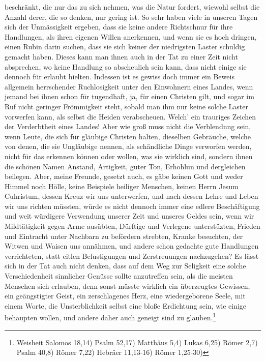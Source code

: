 beschränkt, die nur das zu sich nehmen, was die Natur fordert, wiewohl selbst
die Anzahl derer, die so denken, nur gering ist. So sehr haben viele in unseren
Tagen sich der Unmässigkeit ergeben, dass sie keine andere Richtschnur für ihre
Handlungen, als ihren eigenen Willen anerkennen, und wenn sie es hoch dringen,
einen Rubin darin suchen, dass sie sich keiner der niedrigsten Laster schuldig
gemacht haben. Dieses kann man ihnen auch in der Tat zu einer Zeit nicht
absprechen, wo keine Handlung so abscheulich sein kann, dass nicht einige sie
dennoch für erlaubt hielten. Indessen ist es gewiss doch immer ein Beweis
allgemein herrschender Ruchlosigkeit unter den Einwohnern eines Landes, wenn
jemand bei ihnen schon für tugendhaft, ja, für einen Christen gilt, und sogar im
Ruf nicht geringer Frömmigkeit steht, sobald man ihm nur keine solche Laster
vorwerfen kann, als selbst die Heiden verabscheuen.
Welch' ein trauriges 
Zeichen
der Verderbtheit eines Landes! Aber wie groß muss 
nicht die Verblendnng sein,
wenn Leute, die sich für gläubige Christen halten, dieselben Gebräuche, welche
von denen, die sie Ungläubige nennen, als schändliche Dinge verworfen werden,
nicht für das erkennen können oder wollen, was sie wirklich sind, sondern ihnen
die schönen Namen Anstand, Artigkeit, guter Ton, Erhohlun und dergleichen
beilegen.
Aber, meine Freunde, gesetzt auch, es gäbe keinen Gott und weder Himmel noch
Hölle, keine Beispiele heiliger Menschen, keinen Herrn Jesum Cuhristum, dessen
Kreuz wir uns unterwerfen, und nach dessen Lehre und Leben
wir uns richten
müssten, würde es nicht dennoch immer eine edlere Beschäftigung und weit
würdigere Verwendung unserer Zeit und unseres Geldes sein, wenn wir
Mildtätigkeit gegen Arme ausübten, Dürftige und Verlegene
unterstüzten,
Frieden und Eintracht unter Nachbarn zu befördern strebten, Kranke besuchten,
der Witwen und Waisen uns annähmen, und andere schon gedachte gute Handlungen
verrichteten, statt eitlen Belustigungen und Zerstreuungen nachzugehen? Es lässt
sich in der Tat auch nicht denken, dass auf dem Weg zur Seligkeit eine solche
Verschiedenheit sinnlicher Genüsse sollte anzutreffen sein, als die meisten
Menschen sich erlauben, denn sonst müsste wirklich ein überzeugtes Gewissen, ein
geängstigter Geist, ein zerschlagenes Herz, eine wiedergeborene Seele, mit
einem Worte, die Unsterblichkeit selbst eine bloße Erdichtung sein, wie einige
behaupten wollen, und andere daher auch geneigt sind zu
glauben.\footnote{Weisheit Salomos 18,14)
Psalm 52,17)
Matthäus 5,4)
Lukas 6,25)
Römer 2,7)
Psalm 40,8)
Römer 7,22)
Hebräer 11,13-16)
Römer 1,25-30)}
